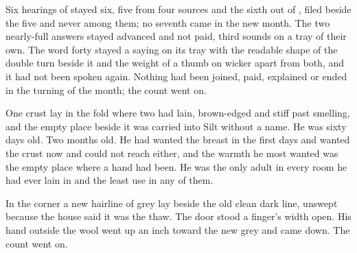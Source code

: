 Six hearings of  stayed six, five from four sources and the sixth out of , filed beside the five and never among them; no seventh came in the new month. The two nearly-full answers stayed advanced and not paid, third sounds on a tray of their own. The word forty stayed a saying on its tray with the readable shape of the double turn beside it and the weight of a thumb on wicker apart from both, and it had not been spoken again. Nothing had been joined, paid, explained or ended in the turning of the month; the count went on.

One crust lay in the fold where two had lain, brown-edged and stiff past smelling, and the empty place beside it was carried into Silt without a name. He was sixty days old. Two months old. He had wanted the breast in the first days and wanted the crust now and could not reach either, and the warmth he most wanted was the empty place where a hand had been. He was the only adult in every room he had ever lain in and the least use in any of them.

In the corner a new hairline of grey lay beside the old clean dark line, unswept because the house said it was the thaw. The door stood a finger's width open. His hand outside the wool went up an inch toward the new grey and came down. The count went on.
